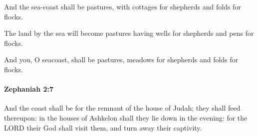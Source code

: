 			\begin{versebox}
					\item[BHS] 
					\item[LXX] 
					\item[ASV] And the sea-coast shall be pastures, with cottages for shepherds and folds for flocks.
					\item[NIV] The land by the sea will become pastures having wells for shepherds and pens for flocks.
					\item[NRSV] And you, O seacoast, shall be pastures, meadows for shepherds and folds for flocks.
			\end{versebox}

		\paragraph{Zephaniah 2:7} %
			\label{ZEPHANIAH-2-7}

			And the coast shall be for the remnant of the house of Judah; they shall feed thereupon: in the houses of Ashkelon shall they lie down in the evening: for the LORD their God shall visit them, and turn away their captivity.

